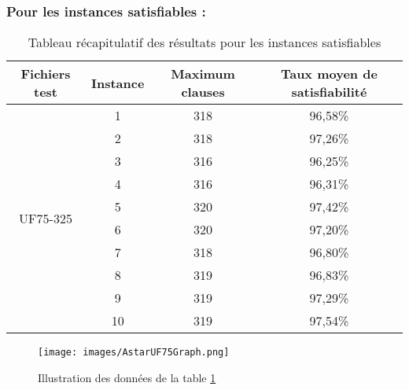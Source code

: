 \subsubsection{Pour les instances satisfiables :}
\begin{table}[H]
	\centering
	\begin{tabular}{|c|c|c|c|}
		\hline
		Fichiers test              & Instance & Maximum clauses & Taux moyen de satisfiabilité \\ \hline
		\multirow{10}{*}{UF75-325} & 1        & 318             & 96,58\%                      \\ \cline{2-4} 
		& 2        & 318             & 97,26\%                      \\ \cline{2-4} 
		& 3        & 316             & 96,25\%                      \\ \cline{2-4} 
		& 4        & 316             & 96,31\%                      \\ \cline{2-4} 
		& 5        & 320             & 97,42\%                      \\ \cline{2-4} 
		& 6        & 320             & 97,20\%                      \\ \cline{2-4} 
		& 7        & 318             & 96,80\%                      \\ \cline{2-4} 
		& 8        & 319             & 96,83\%                      \\ \cline{2-4} 
		& 9        & 319             & 97,29\%                      \\ \cline{2-4} 
		& 10       & 319             & 97,54\%                      \\ \hline
	\end{tabular}
	\caption{Tableau récapitulatif des résultats pour les instances satisfiables}
	\label{table:Tab_Astar_Sat}
\end{table}
\begin{figure}[H]
	\texttt{[image: images/AstarUF75Graph.png]}
	\caption{Illustration des données de la table \ref{table:Tab_Astar_Sat}}
\end{figure}


